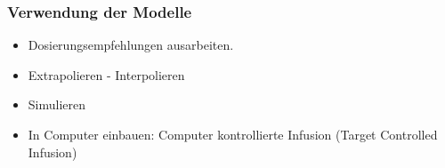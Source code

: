 \mode*

\begin{frame}
\frametitle{Verwendung der Modelle}
\begin{itemize}[<+->]
\item
Dosierungsempfehlungen ausarbeiten.
\item
Extrapolieren - Interpolieren
\item
Simulieren
\item
In Computer einbauen: Computer kontrollierte Infusion (Target Controlled Infusion)
\end{itemize}
\infina
\end{frame}

